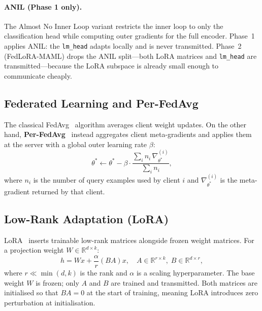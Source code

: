 \documentclass[12pt]{article}
\theoremstyle{plain}
\begin{document}
\paragraph{ANIL (Phase 1 only).}
The Almost No Inner Loop variant restricts the inner loop to only the
classification head while computing outer gradients for the full encoder.
Phase~1 applies ANIL: the \texttt{lm\_head} adapts locally and is never
transmitted.
Phase~2 (FedLoRA-MAML) drops the ANIL split---both LoRA matrices and
\texttt{lm\_head} are transmitted---because the LoRA subspace is already
small enough to communicate cheaply.

\subsection{Federated Learning and Per-FedAvg}

The classical FedAvg~\cite{mcmahan2017fedavg} algorithm averages client weight updates.
On the other hand, \textbf{Per-FedAvg}~\cite{fallah2020perfedavg} instead aggregates client
meta-gradients and applies them at the server with a global outer
learning rate $\beta$:
\begin{equation}
  \theta^* \leftarrow \theta^* -
    \beta \cdot \frac{\sum_{i} n_i \, \nabla_{\theta^*}^{(i)}}{\sum_i n_i},
  \label{eq:perfedavg}
\end{equation}
where $n_i$ is the number of query examples used by client $i$ and
$\nabla_{\theta^*}^{(i)}$ is the meta-gradient returned by that client.


\subsection{Low-Rank Adaptation (LoRA)}

LoRA~\cite{hu2022lora} inserts trainable low-rank matrices alongside frozen
weight matrices.
For a projection weight $W \in \mathbb{R}^{d \times k}$:
\begin{equation}
  h = Wx + \frac{\alpha}{r}(BA)x,
  \quad A \in \mathbb{R}^{r \times k},\; B \in \mathbb{R}^{d \times r},
  \label{eq:lora}
\end{equation}
where $r \ll \min(d,k)$ is the rank and $\alpha$ is a scaling hyperparameter.
The base weight $W$ is frozen; only $A$ and $B$ are trained and transmitted.
Both matrices are initialised so that $BA = 0$ at the start of training,
meaning LoRA introduces zero perturbation at initialisation.

\end{document}
